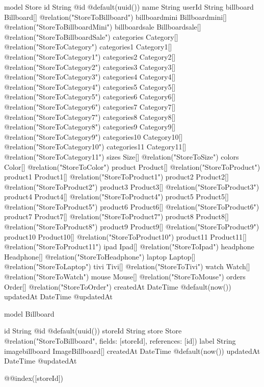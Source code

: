 model Store {
  id            String          @id @default(uuid())
  name          String
  userId        String
  billboard     Billboard[]     @relation("StoreToBillboard")
  billboardmini Billboardmini[] @relation("StoreToBillboardMini")
  billboardsale Billboardsale[] @relation("StoreToBillboardSale")
  categories    Category[]      @relation("StoreToCategory")
  categories1   Category1[]     @relation("StoreToCategory1")
  categories2   Category2[]     @relation("StoreToCategory2")
  categories3   Category3[]     @relation("StoreToCategory3")
  categories4   Category4[]     @relation("StoreToCategory4")
  categories5   Category5[]     @relation("StoreToCategory5")
  categories6   Category6[]     @relation("StoreToCategory6")
  categories7   Category7[]     @relation("StoreToCategory7")
  categories8   Category8[]     @relation("StoreToCategory8")
  categories9   Category9[]     @relation("StoreToCategory9")
  categories10  Category10[]    @relation("StoreToCategory10")
  categories11  Category11[]    @relation("StoreToCategory11")
  sizes         Size[]          @relation("StoreToSize")
  colors        Color[]         @relation("StoreToColor")
  product       Product[]       @relation("StoreToProduct")
  product1      Product1[]      @relation("StoreToProduct1")
  product2      Product2[]      @relation("StoreToProduct2")
  product3      Product3[]      @relation("StoreToProduct3")
  product4      Product4[]      @relation("StoreToProduct4")
  product5      Product5[]      @relation("StoreToProduct5")
  product6      Product6[]      @relation("StoreToProduct6")
  product7      Product7[]      @relation("StoreToProduct7")
  product8      Product8[]      @relation("StoreToProduct8")
  product9      Product9[]      @relation("StoreToProduct9")
  product10      Product10[]      @relation("StoreToProduct10")
  product11      Product11[]      @relation("StoreToProduct11")
  ipad          Ipad[]          @relation("StoreToIpad")
  headphone     Headphone[]     @relation("StoreToHeadphone")
  laptop        Laptop[]        @relation("StoreToLaptop")
  tivi          Tivi[]          @relation("StoreToTivi")
  watch         Watch[]         @relation("StoreToWatch")
  mouse         Mouse[]         @relation("StoreToMouse")
  orders        Order[]         @relation("StoreToOrder")
  createdAt     DateTime        @default(now())
  updatedAt     DateTime        @updatedAt
}

model Billboard {
  id             String           @id @default(uuid())
  storeId        String
  store          Store            @relation("StoreToBillboard", fields: [storeId], references: [id])
  label          String
  imagebillboard ImageBillboard[]
  createdAt      DateTime         @default(now())
  updatedAt      DateTime         @updatedAt

  @@index([storeId])
}

